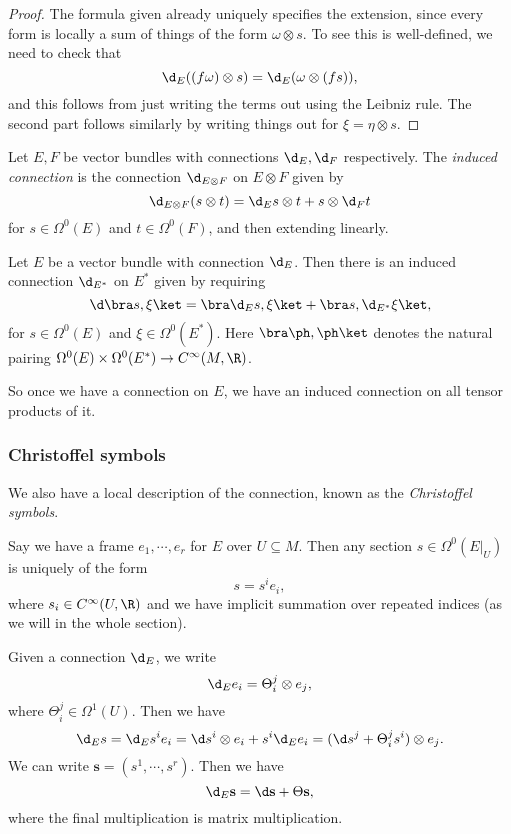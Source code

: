 \documentclass[a4paper]{article}
\begin{document}
\begin{proof}
  The formula given already uniquely specifies the extension, since every form is locally a sum of things of the form $\omega \otimes s$. To see this is well-defined, we need to check that
  \[
    \d_E ((f \omega) \otimes s) = \d_E (\omega \otimes (fs)),
  \]
  and this follows from just writing the terms out using the Leibniz rule. The second part follows similarly by writing things out for $\xi = \eta \otimes s$.
\end{proof}
\begin{defi}
  Let $E, F$ be vector bundles with connections $\d_E, \d_F$ respectively. The \emph{induced connection} is the connection $\d_{E \otimes F}$ on $E \otimes F$ given by
  \[
    \d_{E \otimes F}(s \otimes t) = \d_E s \otimes t + s \otimes \d_F t
  \]
  for $s \in \Omega^0(E)$ and $t \in \Omega^0(F)$, and then extending linearly.
\end{defi}

\begin{defi}
  Let $E$ be a vector bundle with connection $\d_E$. Then there is an induced connection $\d_{E^*}$ on $E^*$ given by requiring
  \[
    \d\bra s, \xi\ket = \bra \d_E s, \xi\ket + \bra s, \d_{E^*} \xi\ket,
  \]
  for $s \in \Omega^0(E)$ and $\xi \in \Omega^0(E^*)$. Here $\bra \ph, \ph\ket$ denotes the natural pairing $\Omega^0(E) \times \Omega^0(E^*) \to C^\infty(M, \R)$.
\end{defi}
So once we have a connection on $E$, we have an induced connection on all tensor products of it.


\subsubsection*{Christoffel symbols}
We also have a local description of the connection, known as the \emph{Christoffel symbols}.

Say we have a frame $e_1, \cdots, e_r$ for $E$ over $U \subseteq M$. Then any section $s \in \Omega^0(E|_U)$ is uniquely of the form
\[
  s = s^i e_i,
\]
where $s_i \in C^\infty(U, \R)$ and we have implicit summation over repeated indices (as we will in the whole section).

Given a connection $\d_E$, we write
\[
  \d_E e_i = \Theta_i^j \otimes e_j,
\]
where $\Theta_i^j \in \Omega^1(U)$. Then we have
\[
  \d_E s = \d_E s^i e_i = \d s^i \otimes e_i + s^i \d_E e_i = (\d s^j + \Theta_i^j s^i) \otimes e_j.
\]
We can write $\mathbf{s} = (s^1, \cdots, s^r)$. Then we have
\[
  \d_E \mathbf{s} = \d \mathbf{s} + \Theta \mathbf{s},
\]
where the final multiplication is matrix multiplication.
\end{document}
